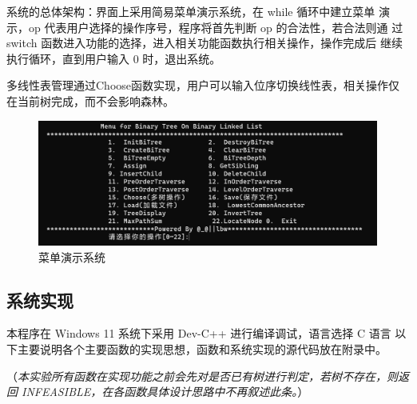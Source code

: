 \documentclass[supercite]{Experimental_Report}
\theoremstyle{definition}
\begin{document}
系统的总体架构：界面上采用简易菜单演示系统，在 while 循环中建立菜单
演示，op 代表用户选择的操作序号，程序将首先判断 op 的合法性，若合法则通
过 switch 函数进入功能的选择，进入相关功能函数执行相关操作，操作完成后
继续执行循环，直到用户输入 0 时，退出系统。

多线性表管理通过Choose函数实现，用户可以输入位序切换线性表，相关操作仅在当前树完成，而不会影响森林。
\begin{figure}[H]
	\centering
	\includegraphics[width=1\linewidth]{images/树的菜单设计.png}
	\caption{菜单演示系统}
	\label{fig2-1}
\end{figure}
\subsection{系统实现}
本程序在 Windows 11 系统下采用 Dev-C++ 进行编译调试，语言选择 C 语言
以下主要说明各个主要函数的实现思想，函数和系统实现的源代码放在附录中。

（\emph{本实验所有函数在实现功能之前会先对是否已有树进行判定，若树不存在，则返回 INFEASIBLE，在各函数具体设计思路中不再叙述此条。}）
\end{document}
